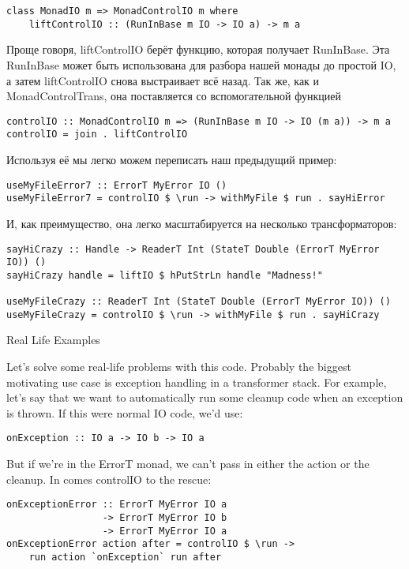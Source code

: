 \begin{lstlisting}
class MonadIO m => MonadControlIO m where
    liftControlIO :: (RunInBase m IO -> IO a) -> m a
\end{lstlisting}

Проще говоря, liftControlIO берёт функцию, которая получает RunInBase. Эта RunInBase может быть использована для разбора нашей монады до простой IO, а затем liftControlIO снова выстраивает всё назад. Так же, как и MonadControlTrans, она поставляется со вспомогательной функцией

\begin{lstlisting}
controlIO :: MonadControlIO m => (RunInBase m IO -> IO (m a)) -> m a
controlIO = join . liftControlIO
\end{lstlisting}

Используя её мы легко можем переписать наш предыдущий пример:

\begin{lstlisting}
useMyFileError7 :: ErrorT MyError IO ()
useMyFileError7 = controlIO $ \run -> withMyFile $ run . sayHiError
\end{lstlisting}

И, как преимущество, она легко масштабируется на несколько трансформаторов:

\begin{lstlisting}
sayHiCrazy :: Handle -> ReaderT Int (StateT Double (ErrorT MyError IO)) ()
sayHiCrazy handle = liftIO $ hPutStrLn handle "Madness!"

useMyFileCrazy :: ReaderT Int (StateT Double (ErrorT MyError IO)) ()
useMyFileCrazy = controlIO $ \run -> withMyFile $ run . sayHiCrazy
\end{lstlisting}

Real Life Examples

Let's solve some real-life problems with this code. Probably the biggest motivating use case is exception handling in a transformer stack. For example, let's say that we want to automatically run some cleanup code when an exception is thrown. If this were normal IO code, we'd use:

\begin{lstlisting}
onException :: IO a -> IO b -> IO a
\end{lstlisting}

But if we're in the ErrorT monad, we can't pass in either the action or the cleanup. In comes controlIO to the rescue:

\begin{lstlisting}
onExceptionError :: ErrorT MyError IO a
                 -> ErrorT MyError IO b
                 -> ErrorT MyError IO a
onExceptionError action after = controlIO $ \run ->
    run action `onException` run after
\end{lstlisting}

